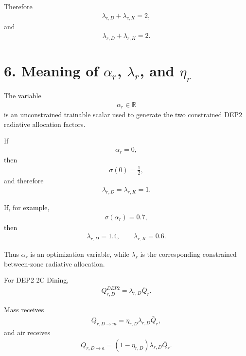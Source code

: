 \documentclass[11pt]{article}
\begin{document}
Therefore
\begin{align}
\boxed{\lambda_{c,D}+\lambda_{c,K}=2,}
\tag{P4.24}
\end{align}
and
\begin{align}
\boxed{\lambda_{r,D}+\lambda_{r,K}=2.}
\tag{P4.25}
\end{align}

\section*{6. Meaning of \(\alpha_r\), \(\lambda_r\), and \(\eta_r\)}

The variable
\begin{align}
\boxed{\alpha_r\in\mathbb R}
\tag{P4.26}
\end{align}
is an unconstrained trainable scalar used to generate the two constrained DEP2 radiative allocation factors.

If
\begin{align}
\alpha_r=0,
\end{align}
then
\begin{align}
\sigma(0)=\frac12,
\end{align}
and therefore
\begin{align}
\boxed{\lambda_{r,D}=\lambda_{r,K}=1.}
\tag{P4.27}
\end{align}

If, for example,
\begin{align}
\sigma(\alpha_r)=0.7,
\end{align}
then
\begin{align}
\boxed{
\lambda_{r,D}=1.4,
\qquad
\lambda_{r,K}=0.6.
}
\tag{P4.28}
\end{align}

Thus \(\alpha_r\) is an optimization variable, while \(\lambda_r\) is the corresponding constrained between-zone radiative allocation.

For DEP2 2C Dining,
\begin{align}
Q_{r,D}^{DEP2}
=
\lambda_{r,D}\bar Q_r.
\end{align}

Mass receives
\begin{align}
\boxed{
Q_{r,D\rightarrow m}
=
\eta_{r,D}\lambda_{r,D}\bar Q_r,
}
\tag{P4.29}
\end{align}
and air receives
\begin{align}
\boxed{
Q_{r,D\rightarrow a}
=
(1-\eta_{r,D})\lambda_{r,D}\bar Q_r.
}
\tag{P4.30}
\end{align}
\end{document}
